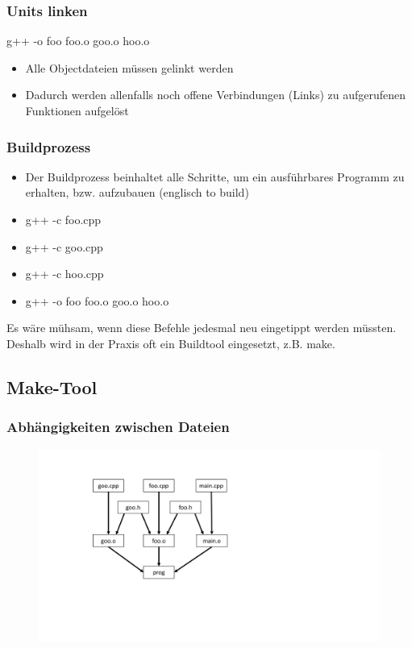 \subsubsection{Units linken}
\label{sec:Units linken}
\begin{center}
	g++ -o foo foo.o goo.o hoo.o
\end{center}
\begin{itemize}
	\item Alle Objectdateien müssen gelinkt werden
	\item Dadurch werden allenfalls noch offene Verbindungen (Links) zu aufgerufenen Funktionen aufgelöst
\end{itemize}

\subsubsection{Buildprozess}
\label{sec:Buildprozess}
\begin{itemize}
	\item Der Buildprozess beinhaltet alle Schritte, um ein ausführbares Programm zu erhalten, bzw. aufzubauen (englisch to build)
	\item[\-] g++ -c foo.cpp
	\item[\-] g++ -c goo.cpp
	\item[\-] g++ -c hoo.cpp	
	\item[\-] g++ -o foo foo.o goo.o hoo.o
\end{itemize}
\begin{hinweis}
	Es wäre mühsam, wenn diese Befehle jedesmal neu eingetippt werden müssten. Deshalb wird in der Praxis oft ein Buildtool eingesetzt, z.B. make.
\end{hinweis}

\subsection{Make-Tool}
\label{sec:Makt-Tool}

\subsubsection{Abhängigkeiten zwischen Dateien}
\label{sec:Abhaengigkeiten zwischen Dateien}
\noindent
\begin{figure}[hh]
	\centering
	\includegraphics[width=0.5\linewidth]{images/make1.pdf}
\end{figure}

